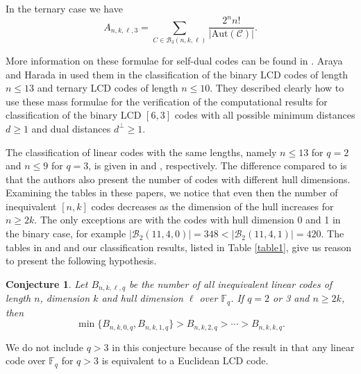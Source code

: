 \documentclass[a4paper,11pt]{article}
\newtheorem{conjecture}{Conjecture}
\newcommand{\F}{\mathbb{F}}
\begin{document}
In the ternary case we have
\begin{equation}
A_{n,k,\ell,3}=\sum_{C\in \mathcal{B}_3(n,k,\ell)}\frac{2^n n!}{|\mathrm{Aut}(\mathcal{C})|}.
\end{equation}

More information on these formulae for self-dual codes can be found in \cite{HP}. Araya and Harada in \cite{Araya-Harada2019} used them in the classification of the binary LCD codes of length $n\le 13$ and ternary LCD codes of length $n\le 10$. They described clearly how to use these mass formulae for the verification of the computational results for classification of the binary LCD $[6,3]$ codes with all possible minimum distances $d\ge 1$ and dual distances $d^\perp\ge 1$.

The classification of linear codes with the same lengths, namely $n\le 13$ for $q=2$ and $n\le 9$ for $q=3$, is given in \cite{LiShi} and \cite{LiShiLing}, respectively. The difference compared to \cite{Araya-Harada2019} is that the authors also present the number of codes with different hull dimensions. Examining the tables in these papers, we notice that even then the number of inequivalent $[n,k]$ codes decreases as the dimension of the hull increases for $n\ge 2k$. The only exceptions are with the codes with hull dimension 0 and 1 in the binary case, for example $|\mathcal{B}_2(11,4,0)|=348<|\mathcal{B}_2(11,4,1)|=420$. The tables in \cite{LiShi} and \cite{LiShiLing} and our classification results, listed in Table \ref{table1}, give us reason to present the following hypothesis.

\begin{conjecture}
Let $B_{n,k,\ell,q}$ be the number of all inequivalent linear codes of length $n$, dimension $k$ and hull dimension $\ell$ over $\F_q$. If $q=2$ or 3 and $n\ge 2k$, then
$$\min\{B_{n,k,0,q},B_{n,k,1,q}\}>B_{n,k,2,q}>\cdots>B_{n,k,k,q}.$$
\end{conjecture}

We do not include $q>3$ in this conjecture because of the result in \cite{Carlet_Pellikaan} that any linear code over $\F_q$ for $q > 3$ is equivalent to a Euclidean LCD code.
\end{document}
